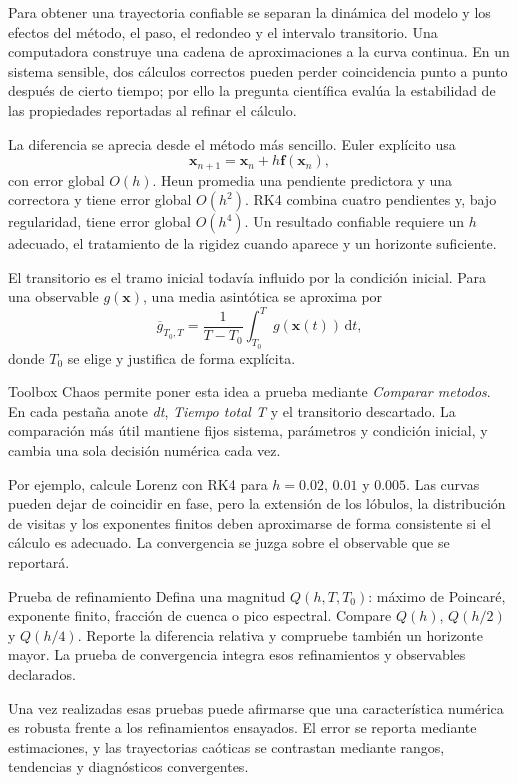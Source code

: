 \documentclass[11pt,a4paper]{article}
\newcommand{\gui}[1]{\textsf{\emph{#1}}}
\newcommand{\dd}{\,\mathrm{d}}
\begin{document}
Para obtener una trayectoria confiable se separan la dinámica del modelo y los
efectos del método, el paso, el redondeo y el intervalo transitorio. Una computadora
construye una cadena de aproximaciones a la curva continua. En un sistema sensible,
dos cálculos correctos pueden perder coincidencia punto a punto después de cierto
tiempo; por ello la pregunta científica evalúa la estabilidad de las propiedades
reportadas al refinar el cálculo.

La diferencia se aprecia desde el método más sencillo. Euler explícito usa
\[
  \mathbf{x}_{n+1}=\mathbf{x}_n+h\mathbf f(\mathbf{x}_n),
\]
con error global $O(h)$. Heun promedia una pendiente predictora y una correctora y
tiene error global $O(h^2)$. RK4 combina cuatro pendientes y, bajo regularidad,
tiene error global $O(h^4)$. Un resultado confiable requiere un $h$ adecuado, el
tratamiento de la rigidez cuando aparece y un horizonte suficiente.

El transitorio es el tramo inicial todavía influido por la condición inicial. Para
una observable $g(\mathbf{x})$, una media asintótica se aproxima por
\[
  \overline g_{T_0,T}=\frac{1}{T-T_0}\int_{T_0}^{T}g(\mathbf{x}(t))\dd t,
\]
donde $T_0$ se elige y justifica de forma explícita.

Toolbox Chaos permite poner esta idea a prueba mediante \gui{Comparar metodos}. En
cada pestaña anote
\gui{dt}, \gui{Tiempo total T} y el transitorio descartado. La comparación más útil
mantiene fijos sistema, parámetros y condición inicial, y cambia una sola decisión
numérica cada vez.

Por ejemplo, calcule Lorenz con RK4 para $h=0.02$, $0.01$ y $0.005$. Las curvas
pueden dejar
de coincidir en fase, pero la extensión de los lóbulos, la distribución de visitas y
los exponentes finitos deben aproximarse de forma consistente si el cálculo es
adecuado. La convergencia se juzga sobre el observable que se reportará.

\begin{evidencebox}{Prueba de refinamiento}
Defina una magnitud $Q(h,T,T_0)$: máximo de Poincaré, exponente finito, fracción de
cuenca o pico espectral. Compare $Q(h)$, $Q(h/2)$ y $Q(h/4)$. Reporte la
diferencia relativa y compruebe también un horizonte mayor. La prueba de convergencia
integra esos refinamientos y observables declarados.
\end{evidencebox}

Una vez realizadas esas pruebas puede afirmarse que una característica numérica es
robusta frente a los refinamientos
ensayados. El error se reporta mediante estimaciones, y las trayectorias caóticas se contrastan mediante rangos, tendencias y diagnósticos convergentes.
\end{document}
